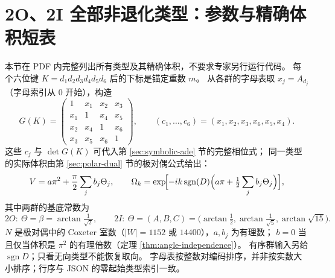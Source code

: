\section{2O、2I 全部非退化类型：参数与精确体积短表}
\label{sec:complete-gram-table}
本节在 PDF 内完整列出所有类型及其精确体积，不要求专家另行运行代码。
每个六位键 $K=d_1d_2d_3d_4d_5d_6$ 后的下标是锚定重数 $m$。
从各群的字母表取 $x_j=A_{d_j}$（字母索引从 0 开始），构造
\[
G(K)=\begin{pmatrix}1&x_1&x_2&x_3\\x_1&1&x_4&x_5\\
x_2&x_4&1&x_6\\x_3&x_5&x_6&1\end{pmatrix},\qquad
(c_1,\ldots,c_6)=(x_1,x_2,x_3,x_6,x_5,x_4).
\]
这些 $c_j$ 与 $\det G(K)$ 可代入第 \ref{sec:symbolic-ade} 节的完整相位式；
同一类型的实际体积由第 \ref{sec:polar-dual} 节的极对偶公式给出：
\[
V=a\pi^2+\frac{\pi}{2}\sum_jb_j\Theta_j,\qquad
\omega_k=\exp\!\Bigl[-ik\operatorname{sgn}(D)\Bigl(a\pi+\tfrac12\sum_jb_j\Theta_j\Bigr)\Bigr],
\]
其中两群的基底常数为
\[
2O:\ \Theta=\beta=\arctan\tfrac1{\sqrt2},\qquad
2I:\ \Theta=(A,B,C)=\bigl(\arctan\tfrac12,\arctan\tfrac1{\sqrt5},\arctan\sqrt{15}\bigr).
\]
$N$ 是极对偶中的 Coxeter 室数（$|W|=1152$ 或 $14400$），$a,b_j$ 为有理数；
$b=0$ 当且仅当体积是 $\pi^2$ 的有理倍数（定理 \ref{thm:angle-independence}）。
有序群输入另给 $\operatorname{sgn}D$；只看无向类型不能恢复取向。
字母表按整数对编码排序，并非按实数大小排序；行序与 JSON 的零起始类型索引一致。
